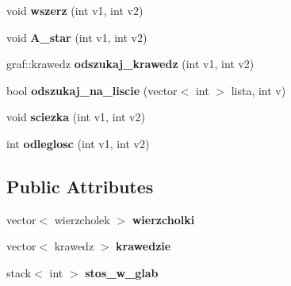 \begin{DoxyCompactItemize}
\item 
\hypertarget{classgraf_afb6519bf2325ac6d4ea38512b1d78eab}{void {\bfseries wszerz} (int v1, int v2)}\label{classgraf_afb6519bf2325ac6d4ea38512b1d78eab}

\item 
\hypertarget{classgraf_a3b8208f6dc409c1896676b9ae6f3e922}{void {\bfseries \-A\-\_\-star} (int v1, int v2)}\label{classgraf_a3b8208f6dc409c1896676b9ae6f3e922}

\item 
\hypertarget{classgraf_a8806936c577edfc5892693e6a5e658ff}{graf\-::krawedz {\bfseries odszukaj\-\_\-krawedz} (int v1, int v2)}\label{classgraf_a8806936c577edfc5892693e6a5e658ff}

\item 
\hypertarget{classgraf_a6ac35d465cd1a0b3e9bc6dc31462ba7a}{bool {\bfseries odszukaj\-\_\-na\-\_\-liscie} (vector$<$ int $>$ lista, int v)}\label{classgraf_a6ac35d465cd1a0b3e9bc6dc31462ba7a}

\item 
\hypertarget{classgraf_a9e2a336e666cad995cb03fc6fc64aef2}{void {\bfseries sciezka} (int v1, int v2)}\label{classgraf_a9e2a336e666cad995cb03fc6fc64aef2}

\item 
\hypertarget{classgraf_aa4a943271723563c1e3801b9c9cd23ba}{int {\bfseries odleglosc} (int v1, int v2)}\label{classgraf_aa4a943271723563c1e3801b9c9cd23ba}

\end{DoxyCompactItemize}
\subsection*{\-Public \-Attributes}
\begin{DoxyCompactItemize}
\item 
\hypertarget{classgraf_aba9e148b3a8916345e88a7e0874fbe10}{vector$<$ wierzcholek $>$ {\bfseries wierzcholki}}\label{classgraf_aba9e148b3a8916345e88a7e0874fbe10}

\item 
\hypertarget{classgraf_a68ced66086e754b1c9de09c713caf614}{vector$<$ krawedz $>$ {\bfseries krawedzie}}\label{classgraf_a68ced66086e754b1c9de09c713caf614}

\item 
\hypertarget{classgraf_a2fc798089cf872256b0cc86d84c1c43b}{stack$<$ int $>$ {\bfseries stos\-\_\-w\-\_\-glab}}\label{classgraf_a2fc798089cf872256b0cc86d84c1c43b}

\end{DoxyCompactItemize}


